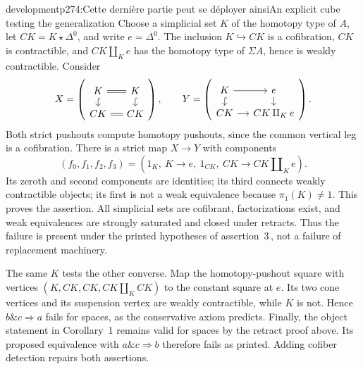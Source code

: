 \begin{dcomment}{development}{p274:Cette dernière partie peut se déployer ainsi}{An explicit cube testing the generalization}
Choose a simplicial set $K$ of the homotopy type of $A$, let $CK=K\star\Delta^0$, and write $e=\Delta^0$. The inclusion $K\hookrightarrow CK$ is a cofibration, $CK$ is contractible, and $CK\amalg_K e$ has the homotopy type of $\Sigma A$, hence is weakly contractible. Consider
\[
 X=\left(\begin{tikzcd}[ampersand replacement=\&, column sep=small,row sep=small]
 K\arrow[r,equal]\arrow[d,hook] \& K\arrow[d,hook]\\
 CK\arrow[r,equal] \& CK
 \end{tikzcd}\right),\qquad
 Y=\left(\begin{tikzcd}[ampersand replacement=\&, column sep=small,row sep=small]
 K\arrow[r]\arrow[d,hook] \& e\arrow[d]\\
 CK\arrow[r] \& CK\amalg_K e
 \end{tikzcd}\right).
\]
Both strict pushouts compute homotopy pushouts, since the common vertical leg is a cofibration. There is a strict map $X\to Y$ with components
\[
 (f_0,f_1,f_2,f_3)=(1_K,\ K\to e,\ 1_{CK},\ CK\to CK\amalg_K e).
\]
Its zeroth and second components are identities; its third connects weakly contractible objects; its first is not a weak equivalence because $\pi_1(K)\ne1$. This proves the assertion. All simplicial sets are cofibrant, factorizations exist, and weak equivalences are strongly saturated and closed under retracts. Thus the failure is present under the printed hypotheses of assertion~3\,\textdegree{}, not a failure of replacement machinery.

The same $K$ tests the other converse. Map the homotopy-pushout square with vertices $(K,CK,CK,CK\amalg_K CK)$ to the constant square at $e$. Its two cone vertices and its suspension vertex are weakly contractible, while $K$ is not. Hence $b\mathbin{\&}c\Rightarrow a$ fails for spaces, as the conservative axiom predicts. Finally, the object statement in Corollary~1 remains valid for spaces by the retract proof above. Its proposed equivalence with $a\mathbin{\&}c\Rightarrow b$ therefore fails as printed. Adding cofiber detection repairs both assertions.
\end{dcomment}

